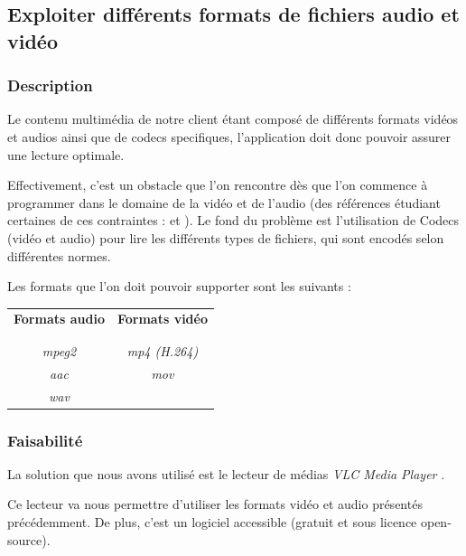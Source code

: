 \subsection{Exploiter différents formats de fichiers audio et vidéo}

\subsubsection{Description}

Le contenu multimédia de notre client étant composé de différents formats vidéos et audios ainsi que de codecs specifiques, l’application doit donc pouvoir assurer une lecture optimale.

Effectivement, c’est un obstacle que l’on rencontre dès que l’on commence à programmer dans le domaine de la vidéo et de l’audio (des références étudiant certaines de ces contraintes : \cite{ghanbari1999video} et \cite{he2013introduction}).
Le fond du problème est l’utilisation de Codecs (vidéo et audio) pour lire les différents types de fichiers, qui sont encodés selon différentes normes.

Les formats que l’on doit pouvoir supporter sont les suivants :\\

\begin{center}
\begin{tabular}{c|c}
\textbf{Formats audio} & \textbf{Formats vidéo} \\
\\
\hline
\\
\textit{mpeg2} & \textit{mp4 (H.264)}\\
\textit{aac} & \textit{mov}\\
\textit{wav} & ~
\end{tabular}
\end{center}
\vspace{0.6cm}

\subsubsection{Faisabilité}

La solution que nous avons utilisé est le lecteur de médias \textit{VLC Media Player} \cite{solutions2006vlc}.

Ce lecteur va nous permettre d'utiliser les formats vidéo et audio présentés précédemment. De plus, c'est un logiciel accessible (gratuit et sous licence open-source).

